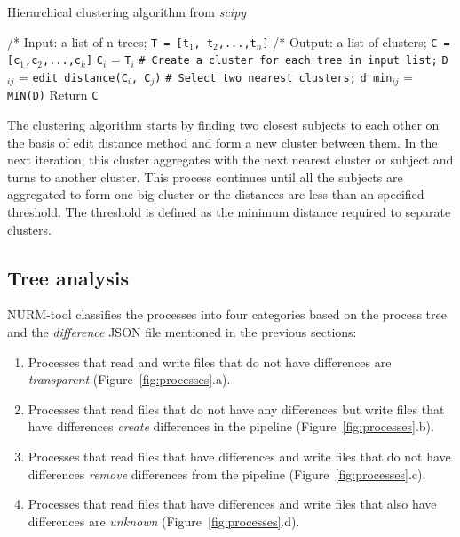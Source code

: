 \documentclass[a4paper,num-refs]{oup-contemporary}
\begin{document}
\begin{algorithm}[h!]
\caption{Hierarchical clustering algorithm from \textit{scipy}}
\label{algo:hclustering}
\begin{algorithmic}

  \State /* Input: a list of n trees; \texttt{T = [t${_1}$, t${_2}$,...,t${_n}$]}
  \State /* Output: a list of clusters; \texttt{C = [c${_1}$,c${_2}$,...,c${_k}$]}
  \State \texttt{C${_i}$} = \texttt{T${_i}$} 
  \State \texttt{\# Create a cluster for each tree in input list;}
  \EndFor
  \State \texttt{D${_{ij}}$} = \texttt{edit\_distance(C${_i}$, C${_j}$)}
  \State \texttt{\# Select two nearest clusters;}
  \EndFor
  \EndFor
  \State \texttt{d\_min${_{ij}}$} = \texttt{MIN(D)}
  \State Return \texttt{C}
  \EndIf
  \EndWhile
\end{algorithmic}
\end{algorithm}

The clustering algorithm starts by finding two closest subjects to each 
other on the basis of edit distance method and form a new cluster 
between them. In the next iteration, this cluster aggregates with the 
next nearest cluster or subject and turns to another cluster. This 
process continues until all the subjects are aggregated to form one big 
cluster or the distances are less than an specified threshold. The 
threshold is defined as the minimum distance required to separate 
clusters. 


\subsection{Tree analysis}

NURM-tool classifies the processes into four 
categories based on the process tree and the \textit{difference} JSON file 
mentioned in the previous sections:
\begin{enumerate}
\item Processes that read and write files that do not have differences 
are \emph{transparent} (Figure~\ref{fig:processes}.a).
\item Processes that read files 
that do not have any differences but write files that have differences 
\emph{create} differences in the pipeline (Figure~\ref{fig:processes}.b).
\item Processes that read files 
that have differences and write files that do not have differences \emph{remove} 
differences from the pipeline (Figure~\ref{fig:processes}.c).
\item Processes that read files that have differences and write files that 
also have differences are 
\emph{unknown} (Figure~\ref{fig:processes}.d).
\end{enumerate}
\end{document}

